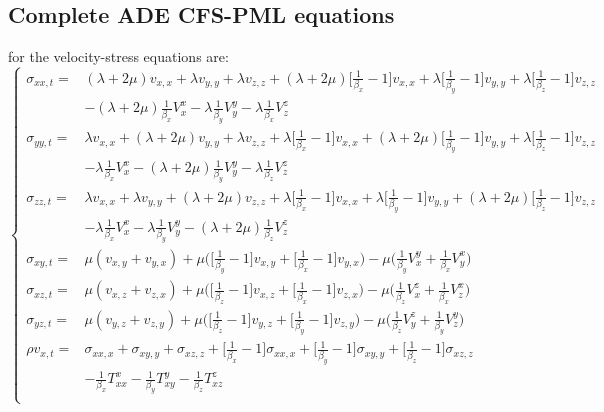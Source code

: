 \subsection{Complete ADE CFS-PML equations}
for the velocity-stress equations are:
\begin{equation*}
 \left\{
  \begin{aligned}
    \sigma_{xx,t}= & (\lambda+2\mu)v_{x,x}+\lambda v_{y,y}+\lambda v_{z,z}+(\lambda+2\mu)\Big[\frac{1}{\beta_x}-1\Big]v_{x,x}+\lambda\Big[\frac{1}{\beta_y}-1\Big]v_{y,y}+\lambda\Big[\frac{1}{\beta_z}-1\Big]v_{z,z} \\
      & -(\lambda+2\mu)\frac{1}{\beta_x}V_x^x-\lambda\frac{1}{\beta_y}V_y^y-\lambda\frac{1}{\beta_x}V_z^z \\
    \sigma_{yy,t}= & \lambda v_{x,x}+(\lambda+2\mu)v_{y,y}+\lambda v_{z,z}+\lambda\Big[\frac{1}{\beta_x}-1\Big]v_{x,x}+(\lambda+2\mu)\Big[\frac{1}{\beta_y}-1\Big]v_{y,y}+\lambda\Big[\frac{1}{\beta_z}-1\Big]v_{z,z} \\
      & -\lambda\frac{1}{\beta_x}V_x^x-(\lambda+2\mu)\frac{1}{\beta_y}V_y^y-\lambda\frac{1}{\beta_z}V_z^z \\
    \sigma_{zz,t}= & \lambda v_{x,x}+\lambda v_{y,y}+(\lambda+2\mu)v_{z,z}+\lambda\Big[\frac{1}{\beta_x}-1\Big]v_{x,x}+\lambda\Big[\frac{1}{\beta_y}-1\Big]v_{y,y}+(\lambda+2\mu)\Big[\frac{1}{\beta_z}-1\Big]v_{z,z} \\
      & -\lambda\frac{1}{\beta_x}V_x^x-\lambda\frac{1}{\beta_y}V_y^y-(\lambda+2\mu)\frac{1}{\beta_z}V_z^z \\
    \sigma_{xy,t}= & \mu(v_{x,y}+v_{y,x})+\mu\Big(\Big[\frac{1}{\beta_y}-1\Big]v_{x,y}+\Big[\frac{1}{\beta_x}-1\Big]v_{y,x}\Big)-\mu\Big(\frac{1}{\beta_y}V_x^y+\frac{1}{\beta_x}V_y^x\Big) \\
    \sigma_{xz,t}= & \mu(v_{x,z}+v_{z,x})+\mu\Big(\Big[\frac{1}{\beta_z}-1\Big]v_{x,z}+\Big[\frac{1}{\beta_x}-1\Big]v_{z,x}\Big)-\mu\Big(\frac{1}{\beta_z}V_x^z+\frac{1}{\beta_x}V_z^x\Big) \\
    \sigma_{yz,t}= & \mu(v_{y,z}+v_{z,y})+\mu\Big(\Big[\frac{1}{\beta_z}-1\Big]v_{y,z}+\Big[\frac{1}{\beta_y}-1\Big]v_{z,y}\Big)-\mu\Big(\frac{1}{\beta_z}V_y^z+\frac{1}{\beta_y}V_z^y\Big) \\
    \rho v_{x,t}= & \sigma_{xx,x}+\sigma_{xy,y}+\sigma_{xz,z}+\Big[\frac{1}{\beta_x}-1\Big]\sigma_{xx,x}+\Big[\frac{1}{\beta_y}-1\Big]\sigma_{xy,y}+\Big[\frac{1}{\beta_z}-1\Big]\sigma_{xz,z} \\
      & -\frac{1}{\beta_x}T_{xx}^x-\frac{1}{\beta_y}T_{xy}^y-\frac{1}{\beta_z}T_{xz}^z \\

\end{aligned}
\end{equation*}
